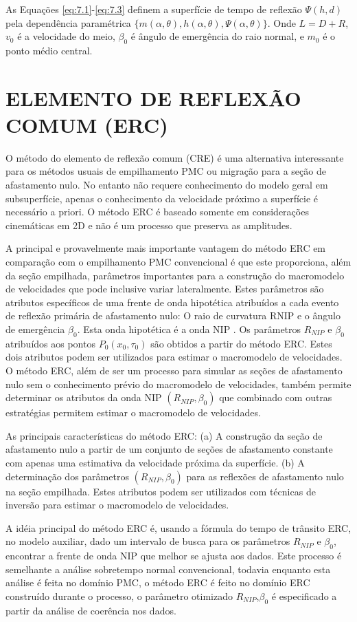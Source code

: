 As Equações \ref{eq:7.1}-\ref{eq:7.3} definem a superfície de tempo de reflexão $\Psi(h,d)$ pela dependência paramétrica
$\{m(\alpha,\theta),h(\alpha,\theta),\Psi(\alpha,\theta)\}$.
Onde $L=D+R$, $v_0$ é a velocidade do meio, $\beta_0$ é ângulo de emergência
do raio normal, e $m_0$ é o ponto médio central.


\section{ELEMENTO DE REFLEXÃO COMUM (ERC)}

O método do elemento de reflexão comum (CRE) é uma alternativa interessante para os métodos usuais de empilhamento PMC ou
migração para a seção de afastamento nulo. No entanto não requere conhecimento do modelo geral em subsuperfície, apenas
o conhecimento da velocidade próximo a superfície é necessário a priori.
O método ERC é baseado somente em considerações cinemáticas em 2D e não é
um processo que preserva as amplitudes.

A principal e provavelmente mais importante vantagem do método ERC em comparação com o empilhamento PMC convencional
é que este proporciona, além da seção empilhada, parâmetros importantes para a construção do macromodelo de 
velocidades que pode inclusive variar lateralmente.
Estes parâmetros são atributos específicos de uma frente de onda hipotética atribuídos a cada evento de reflexão
primária de afastamento nulo: O raio de curvatura RNIP e o ângulo de emergência $\beta_0$. Esta onda hipotética é
a onda NIP \cite{hubral}.
Os parâmetros $R_{NIP}$ e $\beta_0$ atribuídos aos pontos $P_0(x_0,\tau_0)$ são obtidos a partir do método ERC.
Estes dois atributos podem ser utilizados para estimar o macromodelo de velocidades.
O método ERC, além de ser um processo para simular as seções de afastamento nulo sem o conhecimento prévio
do macromodelo de velocidades, também permite determinar os atributos da onda NIP $(R_{NIP},\beta_0)$
que combinado com outras estratégias permitem estimar o macromodelo de velocidades.

As principais características do método ERC:
(a) A construção da seção de afastamento nulo a partir de um conjunto de seções de afastamento constante
com apenas uma estimativa da velocidade próxima da superfície.
(b) A determinação dos parâmetros $(R_{NIP},\beta_0)$ para as reflexões de afastamento nulo na seção empilhada.
Estes atributos podem ser utilizados com técnicas de inversão para estimar o macromodelo de velocidades.

A idéia principal do método ERC é, usando a fórmula do tempo de trânsito ERC, no modelo auxiliar, dado um intervalo
de busca para os parâmetros $R_{NIP}$ e $\beta_0$, encontrar a frente de onda NIP que melhor se ajusta aos dados.
Este processo é semelhante a análise sobretempo normal convencional, todavia enquanto esta análise é feita no
domínio PMC, o método ERC é feito no domínio ERC construído durante o processo, o parâmetro otimizado $R_{NIP}$,$\beta_0$
é especificado a partir da análise de coerência nos dados.


